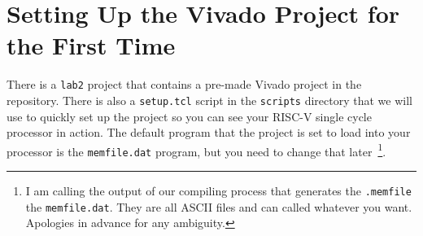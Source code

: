 \documentclass{article}
\begin{document}
\section{Setting Up the Vivado Project for the First Time}

There is a \verb!lab2! project that contains a pre-made Vivado
project in the repository.  There is also a \verb|setup.tcl| script in the \verb!scripts! directory
that we will use to quickly set up the
project so you can see your RISC-V single cycle processor in action.  The default
program that the project is set to load into your processor is the 
\verb|memfile.dat| program, but you need to change that later~\footnote{I
am calling the output of our compiling process that generates the
\verb!.memfile! the \verb!memfile.dat!.  They are all ASCII files and
can called whatever you want.  Apologies in advance for any ambiguity.}.
\end{document}
